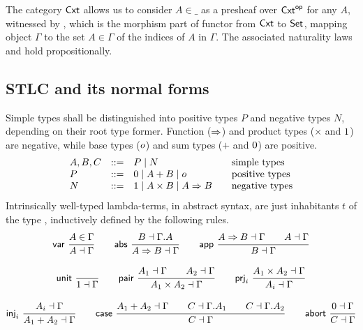 \documentclass[a4paper,USenglish,cleveref, autoref]{lipics-v2019}
\begin{document}
The category $\mathsf{Cxt}$ allows us to consider $A{\in}\_$ as a presheaf over
$\mathsf{Cxt}^{\mathsf{op}}$ for any $A$, witnessed by , which is the morphism
part of functor from $\mathsf{Cxt}$ to $\mathsf{Set}_{}$, mapping object $\Gamma$ to the
set $A \in \Gamma$ of the indices of $A$ in $\Gamma$.
The associated naturality laws 
and  hold propositionally.

\subsection{STLC and its normal forms}

Simple types shall be distinguished into positive types $P$ and
negative types $N$, depending on their root type former.  Function
($\Rightarrow$) and product types ($\times$ and $1$) are negative,
while base types ($o$) and sum types ($+$ and $0$) are positive.
\[
\begin{array}{lrl@{\qquad}l}
  A,B,C & ::= & P \mid N & \mbox{simple types} \\
  P     & ::= & \tyzero \mid A + B \mid \tybase & \mbox{positive types} \\
  N     & ::= & \tyone \mid A \times B \mid A \To B
    & \mbox{negative types} \\
\end{array}
\]
Intrinsically well-typed lambda-terms, in abstract syntax,
are just inhabitants $t$ of the type ,
inductively defined by the following rules.
\begin{gather*}
  \nru{\tvar}{A \in \Gamma}{A \from \Gamma}
\qquad
  \nru{\tabs}{B \from \cext \Gamma A}{A \To B \from \Gamma}
\qquad
  \nru{\tapp}
    {A \To B \from \Gamma \qquad A \from \Gamma}
    {B \from \Gamma}
\\[2ex]
  \nru{\tunit}{}{\tyone \from \Gamma}
\qquad
  \nru{\tpair}
    {A_1 \from \Gamma \qquad A_2 \from \Gamma}
    {A_1 \times A_2 \from \Gamma}
\qquad
  \nru{\tprj_i}
    {A_1 \times A_2 \from \Gamma}
    {A_i \from \Gamma}
\\[2ex]
  \nru{\tinj_i}
    {A_i \from \Gamma}
    {A_1 + A_2 \from \Gamma}
\qquad
  \nru{\tcase}
    {A_1 + A_2 \from \Gamma
      \qquad C \from \cext \Gamma A_1
      \qquad C \from \cext \Gamma A_2
    }{C \from \Gamma}
\qquad
  \nru{\tabort}
    {\tyzero \from \Gamma}
    {C \from \Gamma}
\end{gather*}
\end{document}
